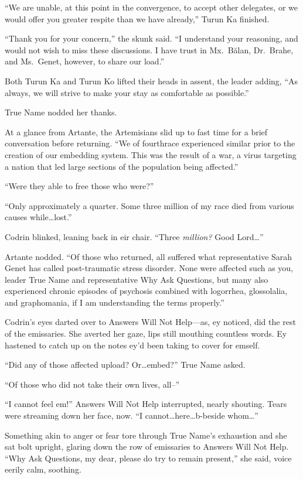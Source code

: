 ``We are unable, at this point in the convergence, to accept other delegates, or we would offer you greater respite than we have already,'' Turun Ka finished.

``Thank you for your concern,'' the skunk said. ``I understand your reasoning, and would not wish to miss these discussions. I have trust in Mx.~Bălan, Dr.~Brahe, and Ms.~Genet, however, to share our load.''

Both Turun Ka and Turun Ko lifted their heads in assent, the leader adding, ``As always, we will strive to make your stay as comfortable as possible.''

True Name nodded her thanks.

At a glance from Artante, the Artemisians slid up to fast time for a brief conversation before returning. ``We of fourthrace experienced similar prior to the creation of our embedding system. This was the result of a war, a virus targeting a nation that led large sections of the population being affected.''

``Were they able to free those who were?''

``Only approximately a quarter. Some three million of my race died from various causes while\ldots lost.''

Codrin blinked, leaning back in eir chair. ``Three \emph{million?} Good Lord\ldots{}''

Artante nodded. ``Of those who returned, all suffered what representative Sarah Genet has called post-traumatic stress disorder. None were affected such as you, leader True Name and representative Why Ask Questions, but many also experienced chronic episodes of psychosis combined with logorrhea, glossolalia, and graphomania, if I am understanding the terms properly.''

Codrin's eyes darted over to Answers Will Not Help—as, ey noticed, did the rest of the emissaries. She averted her gaze, lips still mouthing countless words. Ey hastened to catch up on the notes ey'd been taking to cover for emself.

``Did any of those affected upload? Or\ldots embed?'' True Name asked.

``Of those who did not take their own lives, all--''

``I cannot feel em!'' Answers Will Not Help interrupted, nearly shouting. Tears were streaming down her face, now. ``I cannot\ldots here\ldots b-beside whom\ldots{}''

Something akin to anger or fear tore through True Name's exhaustion and she sat bolt upright, glaring down the row of emissaries to Answers Will Not Help. ``Why Ask Questions, my dear, please do try to remain present,'' she said, voice eerily calm, soothing.

